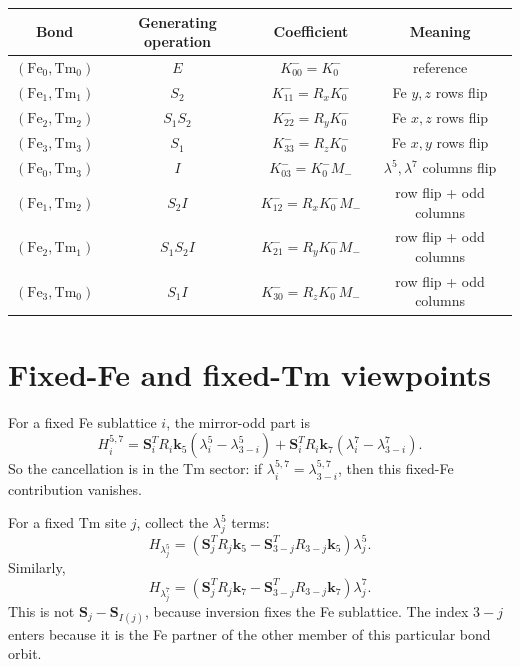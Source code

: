 \documentclass[11pt,a4paper]{article}
\newcommand{\Fe}{\mathrm{Fe}}
\newcommand{\Tm}{\mathrm{Tm}}
\newcommand{\ve}[1]{\boldsymbol{#1}}
\begin{document}
\begin{longtable}{cccc}
\toprule
Bond & Generating operation & Coefficient & Meaning\\
\midrule
$(\Fe_0,\Tm_0)$ & $E$ & $K_{00}^-=K_0^-$ & reference\\
$(\Fe_1,\Tm_1)$ & $S_2$ & $K_{11}^-=R_xK_0^-$ & Fe $y,z$ rows flip\\
$(\Fe_2,\Tm_2)$ & $S_1S_2$ & $K_{22}^-=R_yK_0^-$ & Fe $x,z$ rows flip\\
$(\Fe_3,\Tm_3)$ & $S_1$ & $K_{33}^-=R_zK_0^-$ & Fe $x,y$ rows flip\\
$(\Fe_0,\Tm_3)$ & $I$ & $K_{03}^-=K_0^-M_-$ & $\lambda^5,\lambda^7$ columns flip\\
$(\Fe_1,\Tm_2)$ & $S_2I$ & $K_{12}^-=R_xK_0^-M_-$ & row flip + odd columns\\
$(\Fe_2,\Tm_1)$ & $S_1S_2I$ & $K_{21}^-=R_yK_0^-M_-$ & row flip + odd columns\\
$(\Fe_3,\Tm_0)$ & $S_1I$ & $K_{30}^-=R_zK_0^-M_-$ & row flip + odd columns\\
\bottomrule
\end{longtable}

\section{Fixed-Fe and fixed-Tm viewpoints}

For a fixed Fe sublattice $i$, the mirror-odd part is
\begin{equation}
  H_{i}^{5,7}=\ve S_i^TR_i\ve k_5(\lambda_i^5-\lambda_{3-i}^5)
  +\ve S_i^TR_i\ve k_7(\lambda_i^7-\lambda_{3-i}^7).
\end{equation}
So the cancellation is in the Tm sector: if $\lambda_i^{5,7}=\lambda_{3-i}^{5,7}$, then this fixed-Fe contribution vanishes.

For a fixed Tm site $j$, collect the $\lambda_j^5$ terms:
\begin{equation}
  H_{\lambda_j^5}
  =\left(\ve S_j^TR_j\ve k_5-\ve S_{3-j}^TR_{3-j}\ve k_5\right)\lambda_j^5.
\end{equation}
Similarly,
\begin{equation}
  H_{\lambda_j^7}
  =\left(\ve S_j^TR_j\ve k_7-\ve S_{3-j}^TR_{3-j}\ve k_7\right)\lambda_j^7.
\end{equation}
This is not $\ve S_j-\ve S_{I(j)}$, because inversion fixes the Fe sublattice.  The index $3-j$ enters because it is the Fe partner of the other member of this particular bond orbit.
\end{document}
